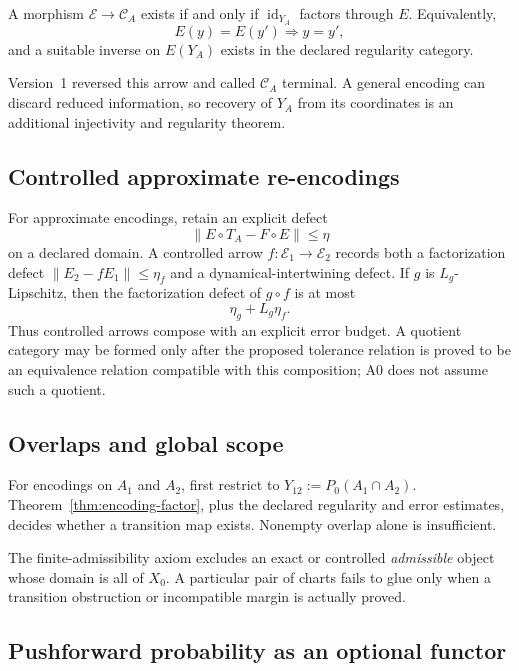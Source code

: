 \documentclass[11pt]{article}
\theoremstyle{plain}
\theoremstyle{plain}
\begin{document}
\begin{proposition}
A morphism $\mathcal E\to\mathcal C_A$ exists if and only if
$\operatorname{id}_{Y_A}$ factors through $E$.  Equivalently,
\[
E(y)=E(y')\Longrightarrow y=y',
\]
and a suitable inverse on $E(Y_A)$ exists in the declared regularity
category.
\end{proposition}

\begin{remark}
Version~1 reversed this arrow and called $\mathcal C_A$ terminal.  A general
encoding can discard reduced information, so recovery of $Y_A$ from its
coordinates is an additional injectivity and regularity theorem.
\end{remark}

\subsection{Controlled approximate re-encodings}

For approximate encodings, retain an explicit defect
\[
\|E\circ T_A-F\circ E\|\le\eta
\]
on a declared domain.  A controlled arrow $f:\mathcal E_1\to\mathcal E_2$
records both a factorization defect
$\|E_2-fE_1\|\le\eta_f$ and a dynamical-intertwining defect.  If $g$ is
$L_g$-Lipschitz, then the factorization defect of $g\circ f$ is at most
\[
\eta_g+L_g\eta_f.
\]
Thus controlled arrows compose with an explicit error budget.  A quotient
category may be formed only after the proposed tolerance relation is proved
to be an equivalence relation compatible with this composition; A0 does not
assume such a quotient.

\subsection{Overlaps and global scope}

For encodings on $A_1$ and $A_2$, first restrict to
$Y_{12}:=P_0(A_1\cap A_2)$.  Theorem~\ref{thm:encoding-factor}, plus the
declared regularity and error estimates, decides whether a transition map
exists.  Nonempty overlap alone is insufficient.

The finite-admissibility axiom excludes an exact or controlled
\emph{admissible} object whose domain is all of $X_0$.  A particular pair of
charts fails to glue only when a transition obstruction or incompatible
margin is actually proved.

\subsection{Pushforward probability as an optional functor}
\end{document}
